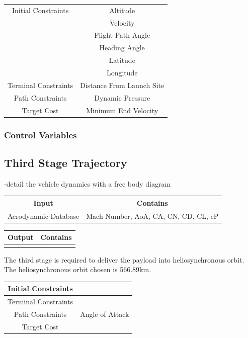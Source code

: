 \begin{tabular}{|c|c|}
	\hline Initial Constraints  & Altitude \\ & Velocity\\ & Flight Path Angle\\ & Heading Angle\\ & Latitude\\ & Longitude\\ 
	\hline Terminal Constraints &  Distance From Launch Site \\ 
	\hline Path Constraints & Dynamic Pressure \\ 
	\hline Target Cost & Minimum End Velocity \\ 
	\hline 
\end{tabular} 

\subsubsection{Control Variables}


\subsection{Third Stage Trajectory}

-detail the vehicle dynamics with a free body diagram 

\begin{tabular}{|c|c|}
	\hline Input  & Contains\\ 
	\hline Aerodynamic Database  & Mach Number, AoA, CA, CN, CD, CL, cP\\ 
	\hline 
\end{tabular} 

\begin{tabular}{|c|c|}
	\hline Output  & Contains\\ 
	\hline   & \\ 
	\hline 
\end{tabular} 

The third stage is required to deliver the payload into heliosynchronous orbit. The heliosynchronous orbit chosen is 566.89km. 

\begin{tabular}{|c|c|}
	\hline Initial Constraints  & \\ 
	\hline Terminal Constraints &  \\ 
	\hline Path Constraints & Angle of Attack \\ 
	\hline Target Cost &  \\ 
	\hline 
\end{tabular} 

